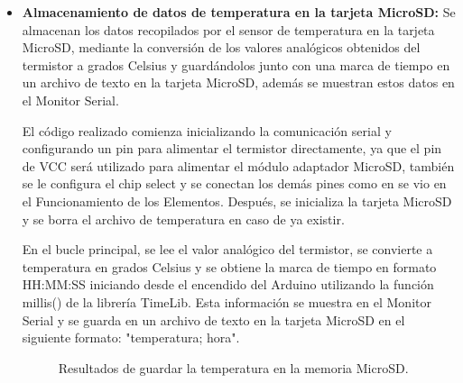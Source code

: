 \begin{itemize}
    \item \textbf{Almacenamiento de datos de temperatura en la tarjeta MicroSD:} Se almacenan los datos recopilados por el sensor de temperatura en la tarjeta MicroSD, mediante la conversión de los valores analógicos obtenidos del termistor a grados Celsius y guardándolos junto con una marca de tiempo en un archivo de texto en la tarjeta MicroSD, además se muestran estos datos en el Monitor Serial.

El código realizado comienza inicializando la comunicación serial y configurando un pin para alimentar el termistor directamente, ya que el pin de VCC será utilizado para alimentar el módulo adaptador MicroSD, también se le configura el chip select y se conectan los demás pines como en se vio en el Funcionamiento de los Elementos. Después, se inicializa la tarjeta MicroSD y se borra el archivo de temperatura en caso de ya existir.

En el bucle principal, se lee el valor analógico del termistor, se convierte a temperatura en grados Celsius y se obtiene la marca de tiempo en formato HH:MM:SS iniciando desde el encendido del Arduino utilizando la función millis() de la librería TimeLib. Esta información se muestra en el Monitor Serial y se guarda en un archivo de texto en la tarjeta MicroSD en el siguiente formato: "temperatura; hora".

\begin{figure}[H]
    \centering
    \quad
    \caption{Resultados de guardar la temperatura en la memoria MicroSD.}
    \label{fig:temp-memoria-code}
\end{figure}


\end{itemize}
